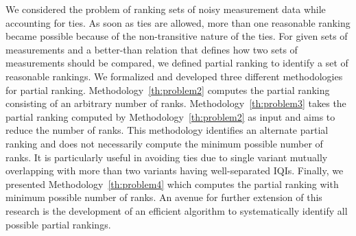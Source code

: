 \documentclass[acmsmall,screen, review]{acmart}
\begin{document}
 We considered the problem of ranking sets of noisy measurement data while accounting for ties. As soon as ties are allowed, more than one reasonable ranking became possible because of the non-transitive nature of the ties. For given sets of measurements and a  better-than relation that defines how two sets of measurements should be compared, we defined partial ranking to identify a set of reasonable rankings. We formalized and developed three different methodologies for partial ranking. Methodology~\ref{th:problem2} computes the partial ranking consisting of an arbitrary number of ranks. Methodology~\ref{th:problem3} takes the partial ranking computed by Methodology~\ref{th:problem2} as input and aims to reduce the number of ranks. This methodology identifies an alternate partial ranking and does not necessarily compute the minimum possible number of ranks. It is particularly useful in avoiding ties due to single variant mutually overlapping with more than two variants having well-separated IQIs. Finally, we presented Methodology~\ref{th:problem4} which computes the partial ranking with minimum possible number of ranks. An avenue for further extension of this research is the development of an efficient algorithm to systematically identify all possible partial rankings. 
 
% 
\end{document}
